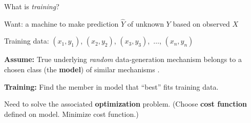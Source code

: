 

\begin{frame}{\Large What is \textit{training}?}

\scriptsize

\pause Want: a machine
\pause to make prediction $\widehat{Y}$
\pause of unknown $Y$
\pause based on observed $X$

\pause
\vskip 0.10cm
Training data:\;
$(x_{1},y_{1})$, $(x_{2},y_{2})$, $(x_{3},y_{3})$, \,$\ldots$\;, $(x_{n},y_{n})$

\small

\pause
\vskip 0.30cm
\textbf{\large Assume:}\;
True underlying \textit{random} data-generation mechanism
belongs to a chosen class (the \textbf{\color{red}model}) of similar mechanisms .
\begin{flushleft}
\vskip -0.2cm

\end{flushleft}

\pause
\textbf{\large Training:}\;
Find the member
in model that ``best'' fits training data.

\pause
\begin{center}
\vskip -0.2cm
Need to solve the associated \textbf{\color{red}optimization} problem.
\pause
\vskip 0.0cm
{\footnotesize(Choose \textbf{\color{red}cost function} defined on model. Minimize cost function.)}
\end{center}

\end{frame}
\normalsize


